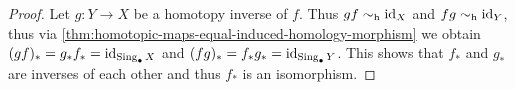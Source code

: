 \begin{proof}
Let \(g: Y \to X\) be a homotopy inverse of \(f\). Thus \(g f \sim_{\text{h}} \operatorname{id}_X\) and
\(f g \sim_{\text{h}} \operatorname{id}_Y\), thus via
\cref{thm:homotopic-maps-equal-induced-homology-morphism} we obtain \((g f)_{*}
= g_{*} f_{*} = \operatorname{id}_{\operatorname{Sing}_{\bullet} X}\) and \((f g)_{*} = f_{*} g_{*} =
\operatorname{id}_{\operatorname{Sing}_{\bullet} Y}\). This shows that \(f_{*}\) and \(g_{*}\) are inverses
of each other and thus \(f_{*}\) is an isomorphism.
\end{proof}






